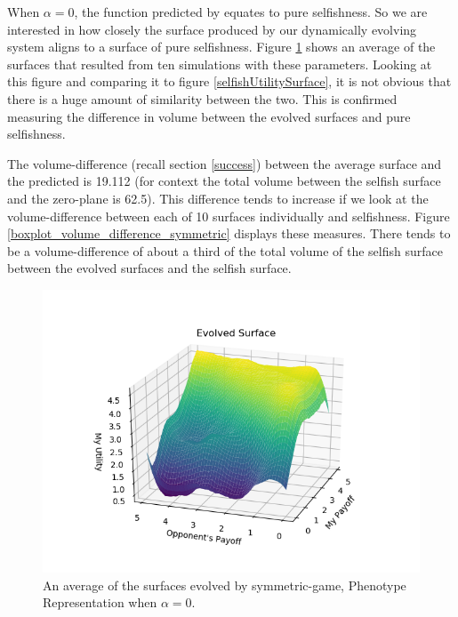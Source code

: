 \documentclass[11pt]{book}
\newcommand*{\np}{\par\noindent\newline}
\begin{document}
\np When $\alpha = 0$, the function predicted by \citet{alger_generalization_2012} equates to pure selfishness.
So we are interested in how closely the surface produced by our dynamically evolving system aligns to a surface of pure selfishness.
Figure \ref{average_r_0_symmetric_evolved} shows an average of the surfaces that resulted from ten simulations with these parameters.
Looking at this figure and comparing it to figure \ref{selfishUtilitySurface}, it is not obvious that there is a huge amount of similarity between the two.
This is confirmed measuring the difference in volume between the evolved surfaces and pure selfishness. 

\np The volume-difference (recall section \ref{success}) between the average surface and the predicted is 19.112 (for context the total volume between the selfish surface and the zero-plane is 62.5).
This difference tends to increase if we look at the volume-difference between each of 10 surfaces individually and selfishness.
Figure \ref{boxplot_volume_difference_symmetric} displays these measures.
There tends to be a volume-difference of about a third of the total volume of the selfish surface between the evolved surfaces and the selfish surface.

\begin{figure}
	\centering
	\includegraphics[scale=0.7]{resources/average_r_0_symmetric_evolved.png}
	\caption{An average of the surfaces evolved by symmetric-game, Phenotype Representation when $\alpha = 0$.}
	\label{average_r_0_symmetric_evolved}
\end{figure}
\end{document}
